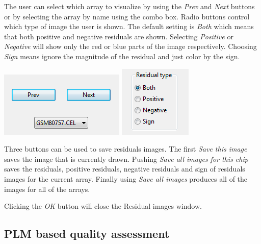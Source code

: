 \documentclass[11pt]{report}
\begin{document}
The user can select which array to visualize by using the {\it Prev} and {\it Next} buttons or by selecting the array by name using the combo box. Radio buttons control which type of image the user is shown. The default setting is {\it Both} which means that both positive and negative residuals are shown. Selecting {\it Positive} or {\it Negative} will show only the red or blue parts of the image respectively. Choosing {\it Sign} means ignore the magnitude of the residual and just color by the sign. 
\begin{center}
\includegraphics[scale=0.5]{residualsimagescontrol1.png}\hspace{0.5in}
\includegraphics[scale=0.5]{residualsimagescontrol2.png}
\end{center}

Three buttons can be used to save residuals images. The first {\it Save this image} saves the image that is currently drawn. Pushing {\it Save all images for this chip} saves the residuals, positive residuals, negative residuals and sign of residuals images for the current array. Finally using {\it Save all images} produces all of the images for all of the arrays.

Clicking the {\it OK} button will close the Residual images window.

\subsection{PLM based quality assessment} \label{sec:PLM QC}
\end{document}
